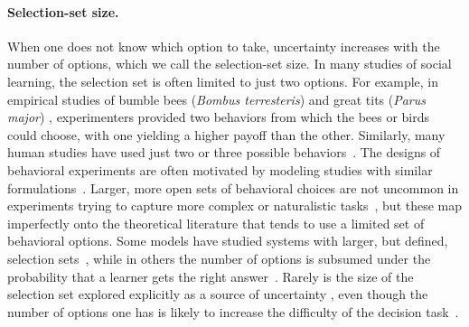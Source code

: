 \documentclass[letterpaper,11.5pt]{scrartcl}
\newcommand{\mt}[1]{{\textcolor{myorange} {({\tiny MT:} #1)}}}
\begin{document}
\paragraph{Selection-set size.}
When one does not know which option to take, uncertainty increases with the number of options, which we call the selection-set size.
In many studies of social learning, the selection set is often limited to just two options.  For example, in empirical studies of bumble bees (\emph{Bombus
terresteris}) \citep{Baracchi2018} and great tits (\emph{Parus major}) \citep{Aplin2017}, experimenters provided two behaviors from which the bees or birds
could choose, with one yielding a higher payoff than the other. %
Similarly, many human studies have used just two or three possible
behaviors~\citep{McElreath2005,Morgan2012, Toyokawa2019}. The designs of behavioral experiments are 
often motivated by modeling studies with similar formulations~\citep{Rogers1988,boyd1995does,Feldman1996,
perreault2012bayesian}.
Larger, more open sets of behavioral choices are not uncommon in experiments trying to capture more complex or naturalistic tasks~\citep{derex2013, wasielewski2014}, but these map imperfectly onto the theoretical literature that tends to use a limited set of behavioral options.
Some models have studied systems with larger, but defined, selection sets~\citep{Rendell2010, lindstrom2016co}, while in others the number of options is subsumed under the probability that a learner gets the right  answer~\citep{Feldman1996,Enquist2007}.
Rarely is the size of the selection set explored explicitly as a source of  uncertainty \citep[though see][]{Muthukrishna2016a}, even though the number of options one has is likely to increase the difficulty of the decision task~\citep{haynes2009testing,white2009testing}.  
\end{document}
